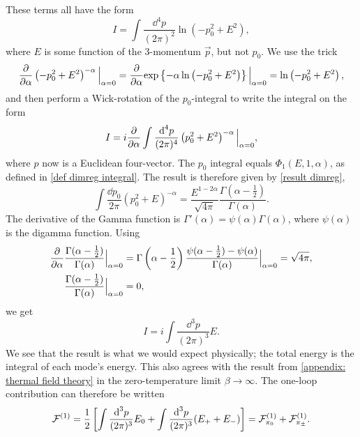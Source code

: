 These terms all have the form
%
\begin{equation}
    \label{free energy logarithmic integral}
    I = \int \frac{\dd^4 p}{(2 \pi)^2} \ln(-p_0^2 + E^2),
\end{equation}
%
where $E$ is some function of the 3-momentum $\vec p$, but not $p_0$.
We use the trick
%
\begin{equation}
    \pdv{}{\alpha} \left(-p_0^2 + E^2\right)^{-\alpha} \Big|_{\alpha=0}
    = \pdv{}{\alpha} \text{exp} \left\{ -\alpha \ln\left(- p_0^2 + E^2\right) \right\} \Big|_{\alpha=0}
    = \ln\left(- p_0^2 + E^2\right),
\end{equation}
%
and then perform a Wick-rotation of the $p_0$-integral to write the integral on the form 
%
\begin{equation}
    I = i \pdv{}{\alpha} \int \frac{\text{d}^4 p}{(2 \pi)^4} \left(p_0^2 + E^2\right)^{-\alpha} \Big|_{\alpha=0},
\end{equation}
%
where $p$ now is a Euclidean four-vector.
The $p_0$ integral equals $\Phi_1(E, 1, \alpha)$, as defined in \autoref{def dimreg integral}. 
The result is therefore given by \autoref{result dimreg},
%
\begin{equation}
    \int \frac{\dd p_0}{2 \pi} (p_0^2 + E)^{-\alpha} 
    = \frac{E^{1-2\alpha}}{\sqrt{4 \pi}} \frac{\Gamma(\alpha-\frac{1}{2})}{\Gamma(\alpha)}.
\end{equation}
%
The derivative of the Gamma function is $\Gamma'(\alpha) = \psi(\alpha)\Gamma(\alpha)$, where $\psi(\alpha)$ is the digamma function.
Using
%
\begin{align}
    \pdv{}{\alpha} & \frac{\Gamma(\alpha - \frac{1}{2}) }{\Gamma(\alpha)} \Big|_{\alpha=0}
    = \Gamma\left(\alpha - \frac{1}{2}\right) \frac{\psi(\alpha - \frac{1}{2}) - \psi(\alpha)}{\Gamma(\alpha)} \Big|_{\alpha=0}
    = \sqrt{4 \pi}, \\
    & \frac{\Gamma(\alpha - \frac{1}{2}) }{\Gamma(\alpha)}\Big|_{\alpha=0} = 0,
\end{align}
%
we get
%
\begin{equation}
    I = i \int \frac{\dd^3 p}{(2 \pi)^3} E.
\end{equation}
%
We see that the result is what we would expect physically; the total energy is the integral of each mode's energy.
This also agrees with the result from \autoref{appendix: thermal field theory} in the zero-temperature limit $\beta \rightarrow \infty$.
The one-loop contribution can therefore be written
%
\begin{equation}
    \mathcal{F}^{(1)} = 
    \frac{1}{2} 
    \left[\int \frac{\text{d}^3 p}{(2\pi)^3} E_0 + \int  \frac{\text{d}^3 p}{(2\pi)^3} (E_+ + E_-)\right]
    = \mathcal{F}^{(1)}_{\pi_0} +\mathcal{F}^{(1)}_{\pi_\pm}.
\end{equation}
